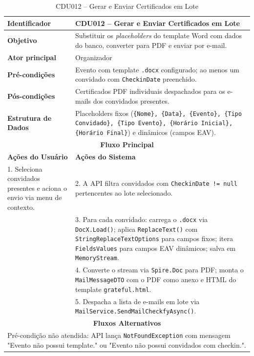 \begin{table}[htbp]
\centering
\caption{CDU012 – Gerar e Enviar Certificados em Lote}
\begin{tabular}{|p{4cm}|p{11cm}|}
\hline
\textbf{Identificador} & CDU012 – Gerar e Enviar Certificados em Lote \\ \hline
\textbf{Objetivo} & Substituir os \textit{placeholders} do template Word com dados do banco, converter para PDF e enviar por e-mail. \\ \hline
\textbf{Ator principal} & Organizador \\ \hline
\textbf{Pré-condições} & Evento com template \texttt{.docx} configurado; ao menos um convidado com \texttt{CheckinDate} preenchido. \\ \hline
\textbf{Pós-condições} & Certificados PDF individuais despachados para os e-mails dos convidados presentes. \\ \hline
\textbf{Estrutura de Dados} & Placeholders fixos (\texttt{\{Nome\}, \{Data\}, \{Evento\}, \{Tipo Convidado\}, \{Tipo Evento\}, \{Horário Inicial\}, \{Horário Final\}}) e dinâmicos (campos EAV). \\ \hline
\multicolumn{2}{|c|}{\textbf{Fluxo Principal}} \\ \hline
\textbf{Ações do Usuário} & \textbf{Ações do Sistema} \\ \hline
1. Seleciona convidados presentes e aciona o envio via menu de contexto. & 2. A API filtra convidados com \texttt{CheckinDate != null} pertencentes ao lote selecionado. \\ \hline
 & 3. Para cada convidado: carrega o \texttt{.docx} via \texttt{DocX.Load()}; aplica \texttt{ReplaceText()} com \texttt{StringReplaceTextOptions} para campos fixos; itera \texttt{FieldsValues} para campos EAV dinâmicos; salva em \texttt{MemoryStream}. \\ \hline
 & 4. Converte o stream via \texttt{Spire.Doc} para PDF; monta o \texttt{MailMessageDTO} com o PDF como anexo e HTML do template \texttt{grateful.html}. \\ \hline
 & 5. Despacha a lista de e-mails em lote via \texttt{MailService.SendMailCheckfyAsync()}. \\ \hline
\multicolumn{2}{|c|}{\textbf{Fluxos Alternativos}} \\ \hline
\multicolumn{2}{|p{15cm}|}{Pré-condição não atendida: API lança \texttt{NotFoundException} com mensagem "Evento não possui template." ou "Evento não possui convidados com checkin.".} \\ \hline
\end{tabular}
\end{table}

